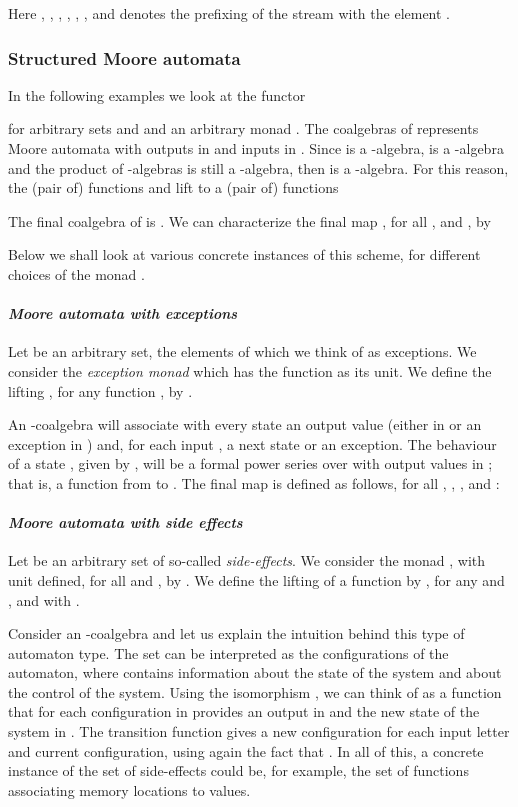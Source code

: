 \documentclass{LMCS}
\begin{document}
Here , , , ,
, ,
and  denotes the prefixing of the stream  with the element .

\subsubsection{Structured Moore automata}

In the following examples we look at the functor

for arbitrary sets  and  and an arbitrary monad
. The coalgebras of  represents Moore
automata with outputs in  and inputs in . Since  is a -algebra,  is a -algebra 
and the product of -algebras is still a -algebra, then  is a -algebra. 
For this reason, 
the (pair of) functions
 and 
lift to a (pair of) functions

The final coalgebra of  is
. We can characterize the final map ,
for all ,  and , by

Below we shall look at various concrete instances of this scheme,
for different choices of the monad .



\paragraph{\em Moore automata with exceptions}
Let  be an arbitrary set, the elements of which we think of
as exceptions. We consider the \emph{exception monad}
 which has the function  as its unit. We define the lifting
,
for any function ,
by .


An -coalgebra  will
associate with every state  an output value (either in  or an
exception in ) and, for each input , a next state or an
exception. The behaviour of a state , given by ,
will be a formal power series over  with output values in ;
that is, a function from  to . The final map
is defined as follows, for all , , , and
:

\paragraph{\em Moore automata with side effects}
Let  be an arbitrary set of so-called \emph{side-effects}.
We consider the monad , with unit  defined, for all 
and , by .
We define the lifting 
of a function 
by , for any  and ,
and with .

Consider an -coalgebra  and let us explain the intuition behind this
type of automaton type.
The set 
can be interpreted as the configurations of the automaton, where 
contains information about the state of the system and  about the
control of the system.
Using the isomorphism ,
we can think of  as a function that for each configuration in  provides
an output in  and the new state of the system in .
The transition function  gives a new configuration for each input
letter and current configuration, using again the fact that .
In all of this, a concrete instance of the set of side-effects
could be, for example, the set  of
functions associating memory locations to values.
\end{document}
